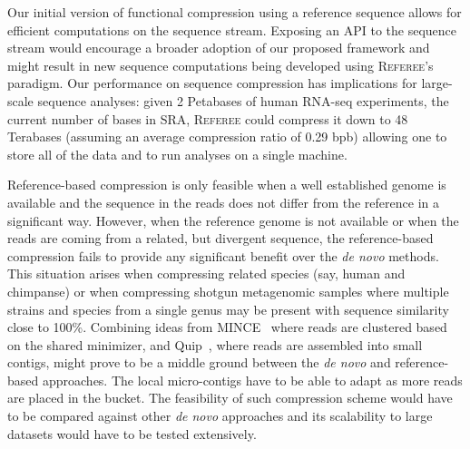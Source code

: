 \documentclass[12pt]{cmuthesis}
\newcommand{\refer}{\textsc{Referee}\xspace}
\begin{document}
Our initial version of functional compression using a reference sequence allows for efficient computations on the sequence stream. Exposing an API to the sequence stream would encourage a broader adoption of our proposed  framework and might result in new sequence computations being developed using \refer's paradigm. Our performance on sequence compression has implications for large-scale sequence analyses: given 2 Petabases of human RNA-seq experiments, the current number of bases in SRA, \refer could compress it down to 48 Terabases (assuming an average compression ratio of 0.29 bpb) allowing one to store all of the data and to run analyses on a single machine.

Reference-based compression is only feasible when a well established genome is available and the sequence in the reads does not differ from the reference in a significant way. However, when the reference genome is not available or when the reads are coming from a related, but divergent sequence, the reference-based compression fails to provide any significant benefit over the \textit{de novo} methods. This situation arises when compressing related species (say, human and chimpanse) or when compressing shotgun metagenomic samples where multiple strains and species from a single genus may be present with sequence similarity close to 100\%. Combining ideas from MINCE~\cite{Mince} where reads are clustered based on the shared minimizer, and Quip~\cite{Jones2012}, where reads are assembled into small contigs, might prove to be a middle ground between the \textit{de novo} and reference-based approaches. The local micro-contigs have to be able to adapt as more reads are placed in the bucket. The feasibility of such compression scheme would have to be compared against other \textit{de novo} approaches and its scalability to large datasets would have to be tested extensively.


% 

\backmatter

\end{document}
